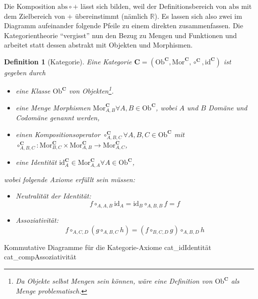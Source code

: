 \documentclass[a4paper, bibgerm]{article}
\newcommand\subfig{}
\newtheorem{defi}{Definition}
\begin{document}
Die Komposition $\mathrm{abs} \circ +$ lässt sich bilden, weil der
Definitionsbereich von $\mathrm{abs}$ mit dem Zielbereich von $+$
übereinstimmt (nämlich $\mathbb{R}$). Es lassen sich also zwei im
Diagramm aufeinander folgende Pfeile zu einem direkten
zusammenfassen. Die Kategorientheorie "`vergisst"' nun den Bezug zu
Mengen und Funktionen und arbeitet statt dessen abstrakt mit Objekten
und Morphismen. 

\begin{defi}[Kategorie]
Eine Kategorie $\mathbf{C} = (\mathrm{Ob}^\mathbf{C}, \mathrm{Mor}^\mathbf{C},
\circ^\mathbf{C}, \mathrm{id}^\mathbf{C})$ ist gegeben durch 
\begin{itemize}
\item eine Klasse $\mathrm{Ob}^\mathbf{C}$ von Objekten\footnote{Da Objekte selbst Mengen
    sein können, wäre eine Definition von $\mathrm{Ob}^\mathbf{C}$ als Menge problematisch.}.
\item eine Menge Morphismen $\mathrm{Mor}^\mathbf{C}_{A,B}\forall A,B \in
  \mathrm{Ob}^\mathbf{C}$, wobei $A$ und $B$ Domäne und Codomäne genannt werden,
\item einen Kompositionsoperator $\circ^\mathbf{C}_{A,B,C}\forall
  A,B,C \in \mathrm{Ob}^\mathbf{C}$ mit \\
  $\circ^\mathbf{C}_{A,B,C} : \mathrm{Mor}^\mathbf{C}_{B,C} \times
  \mathrm{Mor}^\mathbf{C}_{A,B} \rightarrow \mathrm{Mor}^\mathbf{C}_{A,C}$,
\item eine Identität $\mathrm{id}^\mathbf{C}_A \in \mathrm{Mor}^\mathbf{C}_{A,A}\forall A \in \mathrm{Ob}^\mathbf{C}$,
\end{itemize}
wobei folgende Axiome erfüllt sein müssen:
\begin{itemize}
\item Neutralität der Identität: $$f \circ_{A,A,B} \mathrm{id}_A = \mathrm{id}_B \circ_{A,B,B} f = f$$
\item Assoziativität:
  $$f \circ_{A,C,D} (g \circ_{A,B,C} h) = (f \circ_{B,C,D} g) \circ_{A,B,D}h$$
\end{itemize}
\end{defi}


\begin{figs}{Kommutative Diagramme für die Kategorie-Axiome}
  \subfig{cat_id}{Identität}
  \subfig{cat_comp}{Assoziativität}
\end{figs}

\end{document}
